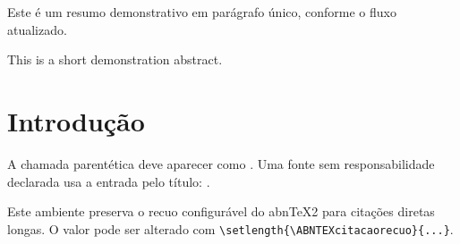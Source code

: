 \documentclass[article,11pt,oneside,a4paper,brazil]{abntex2}
\begin{document}
\maketitle

\begin{resumoumacoluna}
Este é um resumo demonstrativo em parágrafo único, conforme o fluxo atualizado.
\end{resumoumacoluna}

\renewcommand{\resumoname}{Abstract}
\begin{resumoumacoluna}
This is a short demonstration abstract.
\end{resumoumacoluna}

\textual
\section{Introdução}

A chamada parentética deve aparecer como \parencite{silva2024}. Uma fonte sem
responsabilidade declarada usa a entrada pelo título: \parencite{anteprojeto1987}.

\begin{citacao}
Este ambiente preserva o recuo configurável do abnTeX2 para citações diretas
longas. O valor pode ser alterado com \verb|\setlength{\ABNTEXcitacaorecuo}{...}|.
\end{citacao}

\postextual
\printbibliography
\end{document}
